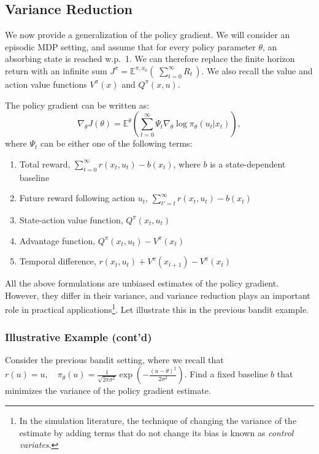 \subsection{Variance Reduction}
We now provide a generalization of the policy gradient. We will consider an episodic MDP setting, and assume that for every policy parameter $\theta$, an absorbing state is reached w.p.~1. We can therefore replace the finite horizon return with an infinite sum ${J^\pi } = {\mathbb E^{\pi ,{x_0}}}(\;\sum\limits_{t = 0}^\infty {{R_t}} \,)$. We also recall the value and action value functions $V^\pi(x)$ and $Q^\pi(x,u)$. 
\begin{proposition}\label{prop:pg_control_variates}
The policy gradient can be written as:
\begin{equation*}
    \nabla_\theta J(\theta) = {\mathbb E^\theta }\left( \sum_{t=0}^\infty \Psi_t {{\nabla _\theta }\log {\pi _\theta }({u_t}|{x_t})} \right),
\end{equation*}
where $\Psi_t$ can be either one of the following terms:
\begin{enumerate}
    \item Total reward, $\sum_{t=0}^\infty r(x_t,u_t) - b(x_t)$, where $b$ is a state-dependent baseline
    \item Future reward following action $u_t$, $\sum_{t'=t}^\infty r(x_t,u_t) - b(x_t)$
    \item State-action value function, $Q^\pi(x_t,u_t)$
    \item Advantage function, $Q^\pi(x_t,u_t) - V^\pi(x_t)$
    \item Temporal difference, $r(x_t,u_t) + V^\pi(x_{t+1})- V^\pi(x_t)$
\end{enumerate}
\end{proposition}

All the above formulations are unbiased estimates of the policy gradient. However, they differ in their variance, and variance reduction plays an important role in practical applications\footnote{In the simulation literature, the technique of changing the variance of the estimate by adding terms that do not change its bias is known as \textit{control variates}.}. Let illustrate this in the previous bandit example.

\subsubsection{Illustrative Example (cont'd)}
Consider the previous bandit setting, where we recall that
$        r(u) = u, \quad
        \pi_\theta(u) = \frac{1}{\sqrt{2 \pi \sigma^2}} \exp (- \frac{(u - \theta)^2}{2 \sigma^2}).$
Find a fixed baseline $b$ that minimizes the variance of the policy gradient estimate.

